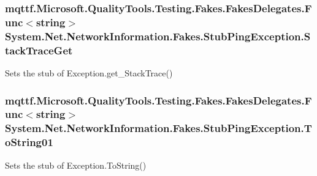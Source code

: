 \hypertarget{class_system_1_1_net_1_1_network_information_1_1_fakes_1_1_stub_ping_exception_a60e43e3d12369d19214befb6f8cf8177}{
\subsubsection[{Stack\-Trace\-Get}]{\setlength{\rightskip}{0pt plus 5cm}mqttf.\-Microsoft.\-Quality\-Tools.\-Testing.\-Fakes.\-Fakes\-Delegates.\-Func$<$string$>$ System.\-Net.\-Network\-Information.\-Fakes.\-Stub\-Ping\-Exception.\-Stack\-Trace\-Get}}\label{class_system_1_1_net_1_1_network_information_1_1_fakes_1_1_stub_ping_exception_a60e43e3d12369d19214befb6f8cf8177}


Sets the stub of Exception.\-get\-\_\-\-Stack\-Trace()

\hypertarget{class_system_1_1_net_1_1_network_information_1_1_fakes_1_1_stub_ping_exception_a1d333ab799f4b4f3b8fa78540a136a89}{
\subsubsection[{To\-String01}]{\setlength{\rightskip}{0pt plus 5cm}mqttf.\-Microsoft.\-Quality\-Tools.\-Testing.\-Fakes.\-Fakes\-Delegates.\-Func$<$string$>$ System.\-Net.\-Network\-Information.\-Fakes.\-Stub\-Ping\-Exception.\-To\-String01}}\label{class_system_1_1_net_1_1_network_information_1_1_fakes_1_1_stub_ping_exception_a1d333ab799f4b4f3b8fa78540a136a89}


Sets the stub of Exception.\-To\-String()



